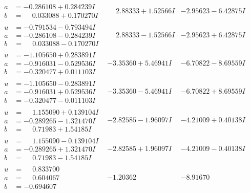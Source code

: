 \documentclass[1p]{elsarticle_modified}
\theoremstyle{definition}
\begin{document}
$$\begin{array}{c|c|c}
\begin{aligned}
a &= -0.286108 + 0.284239 I \\
b &= \phantom{-}0.033088 + 0.170270 I\end{aligned}
 & \phantom{-}2.88333 + 1.52566 I & -2.95623 - 6.42875 I \\ \hline\begin{aligned}
u &= -0.791534 - 0.793494 I \\
a &= -0.286108 - 0.284239 I \\
b &= \phantom{-}0.033088 - 0.170270 I\end{aligned}
 & \phantom{-}2.88333 - 1.52566 I & -2.95623 + 6.42875 I \\ \hline\begin{aligned}
u &= -1.105650 + 0.283891 I \\
a &= -0.916031 - 0.529536 I \\
b &= -0.320477 + 0.011103 I\end{aligned}
 & -3.35360 + 5.46941 I & -6.70822 - 8.69559 I \\ \hline\begin{aligned}
u &= -1.105650 - 0.283891 I \\
a &= -0.916031 + 0.529536 I \\
b &= -0.320477 - 0.011103 I\end{aligned}
 & -3.35360 - 5.46941 I & -6.70822 + 8.69559 I \\ \hline\begin{aligned}
u &= \phantom{-}1.155090 + 0.139104 I \\
a &= -0.289265 - 1.321470 I \\
b &= \phantom{-}0.71983 + 1.54185 I\end{aligned}
 & -2.82585 - 1.96097 I & -4.21009 + 0.40138 I \\ \hline\begin{aligned}
u &= \phantom{-}1.155090 - 0.139104 I \\
a &= -0.289265 + 1.321470 I \\
b &= \phantom{-}0.71983 - 1.54185 I\end{aligned}
 & -2.82585 + 1.96097 I & -4.21009 - 0.40138 I \\ \hline\begin{aligned}
u &= \phantom{-}0.833700\phantom{ +0.000000I} \\
a &= \phantom{-}0.604067\phantom{ +0.000000I} \\
b &= -0.694607\phantom{ +0.000000I}\end{aligned}
 & -1.20362\phantom{ +0.000000I} & -8.91670\phantom{ +0.000000I} \\ \hline\begin{aligned}

\end{aligned}
\end{array}$$
\end{document}
